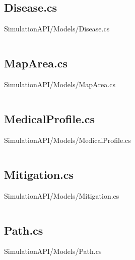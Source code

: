 \inputminted[linenos,breaklines,tabsize=2]{csharp}{/Users/Henry/Desktop/NEAComputerScience/SimulationAPI/Models/Building.cs}

\makeatletter
\subsection*{Disease.cs}
SimulationAPI/Models/Disease.cs
\def\@currentlabelname{Disease.cs}
\label{code:SimulationAPI:Models:Disease.cs}
\makeatother

\inputminted[linenos,breaklines,tabsize=2]{csharp}{/Users/Henry/Desktop/NEAComputerScience/SimulationAPI/Models/Disease.cs}

\makeatletter
\subsection*{MapArea.cs}
SimulationAPI/Models/MapArea.cs
\def\@currentlabelname{MapArea.cs}
\label{code:SimulationAPI:Models:MapArea.cs}
\makeatother

\inputminted[linenos,breaklines,tabsize=2]{csharp}{/Users/Henry/Desktop/NEAComputerScience/SimulationAPI/Models/MapArea.cs}

\makeatletter
\subsection*{MedicalProfile.cs}
SimulationAPI/Models/MedicalProfile.cs
\def\@currentlabelname{MedicalProfile.cs}
\label{code:SimulationAPI:Models:MedicalProfile.cs}
\makeatother

\inputminted[linenos,breaklines,tabsize=2]{csharp}{/Users/Henry/Desktop/NEAComputerScience/SimulationAPI/Models/MedicalProfile.cs}

\makeatletter
\subsection*{Mitigation.cs}
SimulationAPI/Models/Mitigation.cs
\def\@currentlabelname{Mitigation.cs}
\label{code:SimulationAPI:Models:Mitigation.cs}
\makeatother

\inputminted[linenos,breaklines,tabsize=2]{csharp}{/Users/Henry/Desktop/NEAComputerScience/SimulationAPI/Models/Mitigation.cs}

\makeatletter
\subsection*{Path.cs}
SimulationAPI/Models/Path.cs
\def\@currentlabelname{Path.cs}
\label{code:SimulationAPI:Models:Path.cs}
\makeatother

